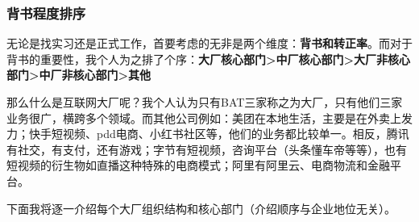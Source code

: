 \subsubsection{背书程度排序}

无论是找实习还是正式工作，首要考虑的无非是两个维度：\textbf{背书和转正率}。而对于背书的重要性，我个人为之排了个序：\textbf{大厂核心部门>中厂核心部门>大厂非核心部门>中厂非核心部门>其他}

那么什么是互联网大厂呢？我个人认为只有BAT三家称之为大厂，只有他们三家业务很广，横跨多个领域。而其他公司例如：美团在本地生活，主要是在外卖上发力；快手短视频、pdd电商、小红书社区等，他们的业务都比较单一。相反，腾讯有社交，有支付，还有游戏；字节有短视频，咨询平台（头条懂车帝等等），也有短视频的衍生物如直播这种特殊的电商模式；阿里有阿里云、电商物流和金融平台。

下面我将逐一介绍每个大厂组织结构和核心部门（介绍顺序与企业地位无关）。

